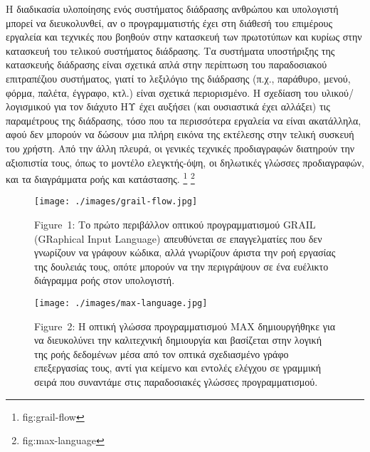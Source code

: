 \documentclass[
]{article}
\begin{document}
Η διαδικασία υλοποίησης ενός συστήματος διάδρασης ανθρώπου και
υπολογιστή μπορεί να διευκολυνθεί, αν ο προγραμματιστής έχει στη διάθεσή
του επιμέρους εργαλεία και τεχνικές που βοηθούν στην κατασκευή των
πρωτοτύπων και κυρίως στην κατασκευή του τελικού συστήματος διάδρασης.
Τα συστήματα υποστήριξης της κατασκευής διάδρασης είναι σχετικά απλά
στην περίπτωση του παραδοσιακού επιτραπέζιου συστήματος, γιατί το
λεξιλόγιο της διάδρασης (π.χ., παράθυρο, μενού, φόρμα, παλέτα, έγγραφο,
κτλ.) είναι σχετικά περιορισμένο. Η σχεδίαση του υλικού/λογισμικού για
τον διάχυτο ΗΥ έχει αυξήσει (και ουσιαστικά έχει αλλάξει) τις
παραμέτρους της διάδρασης, τόσο που τα περισσότερα εργαλεία να είναι
ακατάλληλα, αφού δεν μπορούν να δώσουν μια πλήρη εικόνα της εκτέλεσης
στην τελική συσκευή του χρήστη. Από την άλλη πλευρά, οι γενικές τεχνικές
προδιαγραφών διατηρούν την αξιοπιστία τους, όπως το μοντέλο
ελεγκτής-όψη, οι δηλωτικές γλώσσες προδιαγραφών, και τα διαγράμματα ροής
και κατάστασης. \footnote{fig:grail-flow} \footnote{fig:max-language}

\leavevmode{}%
\begin{figure}
\hypertarget{fig:grail-flow}{%
\centering
\texttt{[image: ./images/grail-flow.jpg]}
\caption{Figure~1: Το πρώτο περιβάλλον οπτικού προγραμματισμού GRAIL
(GRaphical Input Language) απευθύνεται σε επαγγελματίες που δεν
γνωρίζουν να γράφουν κώδικα, αλλά γνωρίζουν άριστα την ροή εργασίας της
δουλειάς τους, οπότε μπορούν να την περιγράψουν σε ένα ευέλικτο
διάγραμμα ροής στον υπολογιστή.}\label{fig:grail-flow}
}
\end{figure}

\leavevmode{}%
\begin{figure}
\hypertarget{fig:max-language}{%
\centering
\texttt{[image: ./images/max-language.jpg]}
\caption{Figure~2: Η οπτική γλώσσα προγραμματισμού MAX δημιουργήθηκε για
να διευκολύνει την καλιτεχνική δημιουργία και βασίζεται στην λογική της
ροής δεδομένων μέσα από τον οπτικά σχεδιασμένο γράφο επεξεργασίας τους,
αντί για κείμενο και εντολές ελέγχου σε γραμμική σειρά που συναντάμε
στις παραδοσιακές γλώσσες προγραμματισμού.}\label{fig:max-language}
}
\end{figure}
\end{document}
